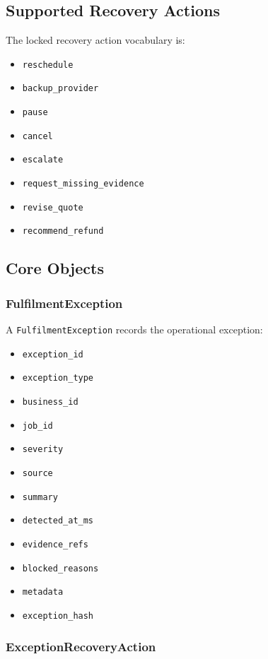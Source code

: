 \subsection{Supported Recovery Actions}

The locked recovery action vocabulary is:

\begin{itemize}
  \item \texttt{reschedule}
  \item \texttt{backup\_provider}
  \item \texttt{pause}
  \item \texttt{cancel}
  \item \texttt{escalate}
  \item \texttt{request\_missing\_evidence}
  \item \texttt{revise\_quote}
  \item \texttt{recommend\_refund}
\end{itemize}

\subsection{Core Objects}

\subsubsection{FulfilmentException}

A \texttt{FulfilmentException} records the operational exception:

\begin{itemize}
  \item \texttt{exception\_id}
  \item \texttt{exception\_type}
  \item \texttt{business\_id}
  \item \texttt{job\_id}
  \item \texttt{severity}
  \item \texttt{source}
  \item \texttt{summary}
  \item \texttt{detected\_at\_ms}
  \item \texttt{evidence\_refs}
  \item \texttt{blocked\_reasons}
  \item \texttt{metadata}
  \item \texttt{exception\_hash}
\end{itemize}

\subsubsection{ExceptionRecoveryAction}

